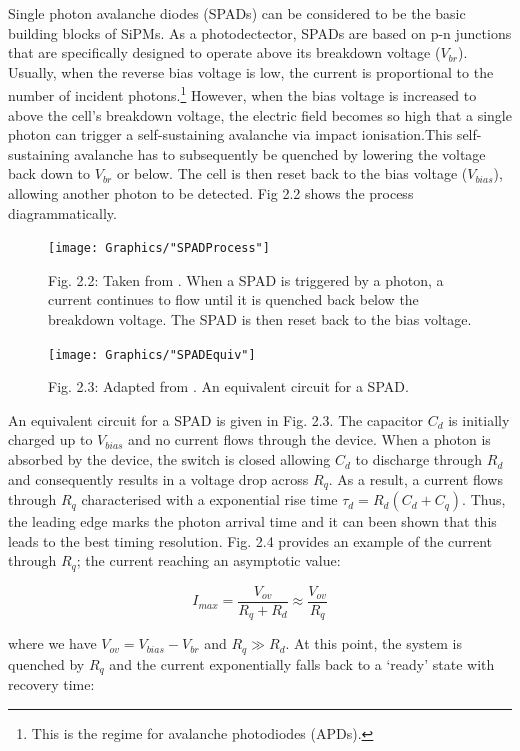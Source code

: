 Single photon avalanche diodes (SPADs) can be considered to be the basic building blocks of SiPMs. As a photodectector, SPADs are based on p-n junctions that are specifically designed to operate above its breakdown voltage ($V_{br}$). \cite{mcintyre1985} Usually, when the reverse bias voltage is low, the current is proportional to the number of incident photons.\footnote{This is the regime for avalanche photodiodes (APDs).} However, when the bias voltage is increased to above the cell's breakdown voltage, the electric field becomes so high that a single photon can trigger a self-sustaining avalanche via impact ionisation.This self-sustaining avalanche has to subsequently be quenched by lowering the voltage back down to $V_{br}$ or below. The cell is then reset back to the bias voltage ($V_{bias}$), allowing another photon to be detected. \cite{cova1996} Fig 2.2 shows the process diagrammatically.

\begin{figure}[h]
  \texttt{[image: Graphics/"SPADProcess"]}
  {\caption*{Fig. 2.2: Taken from \cite{sensl2011}. When a SPAD is triggered by a photon, a current continues to flow until it is quenched back below the breakdown voltage. The SPAD is then reset back to the bias voltage.}}
\end{figure}

\begin{figure}[h]
  \centering
  \texttt{[image: Graphics/"SPADEquiv"]}
  {\caption*{Fig. 2.3: Adapted from \cite{gundacker2020}. An equivalent circuit for a SPAD.}}
\end{figure}

\noindent An equivalent circuit for a SPAD is given in Fig. 2.3. The capacitor $C_d$ is initially charged up to $V_{bias}$ and no current flows through the device. When a photon is absorbed by the device, the switch is closed allowing $C_d$ to discharge through $R_d$ and consequently results in a voltage drop across $R_q$. As a result, a current flows through $R_q$ characterised with a exponential rise time $\tau_d = R_d(C_d+C_q)$. Thus, the leading edge marks the photon arrival time and it can been shown that this leads to the best timing resolution. \cite{gundacker2015} Fig. 2.4 provides an example of the current through $R_q$; the current reaching an asymptotic value:

\[
   I_{max} =  \frac{V_{ov}}{R_q+R_d} \approx \frac{V_{ov}}{R_q}  \tag{2.1}
\]

\noindent where we have $V_{ov}=V_{bias}-V_{br}$ and $R_q \gg R_d$. At this point, the system is quenched by $R_q$ and the current exponentially falls back to a `ready' state with recovery time: \cite{piatek2014}

